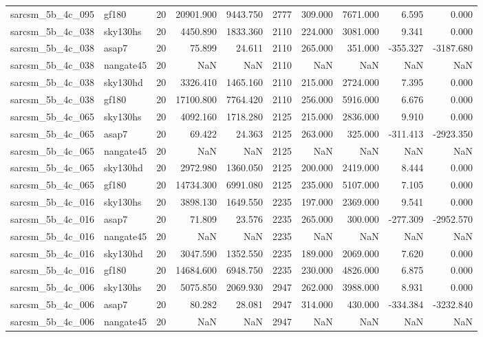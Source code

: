 \documentclass{article}
\begin{document}
\begin{longtable}{llrrrrrrrr}
sarcsm\_5b\_4c\_095 & gf180 & 20 & 20901.900 & 9443.750 & 2777 & 309.000 & 7671.000 & 6.595 & 0.000 \\
sarcsm\_5b\_4c\_038 & sky130hs & 20 & 4450.890 & 1833.360 & 2110 & 224.000 & 3081.000 & 9.341 & 0.000 \\
sarcsm\_5b\_4c\_038 & asap7 & 20 & 75.899 & 24.611 & 2110 & 265.000 & 351.000 & -355.327 & -3187.680 \\
sarcsm\_5b\_4c\_038 & nangate45 & 20 & NaN & NaN & 2110 & NaN & NaN & NaN & NaN \\
sarcsm\_5b\_4c\_038 & sky130hd & 20 & 3326.410 & 1465.160 & 2110 & 215.000 & 2724.000 & 7.395 & 0.000 \\
sarcsm\_5b\_4c\_038 & gf180 & 20 & 17100.800 & 7764.420 & 2110 & 256.000 & 5916.000 & 6.676 & 0.000 \\
sarcsm\_5b\_4c\_065 & sky130hs & 20 & 4092.160 & 1718.280 & 2125 & 215.000 & 2836.000 & 9.910 & 0.000 \\
sarcsm\_5b\_4c\_065 & asap7 & 20 & 69.422 & 24.363 & 2125 & 263.000 & 325.000 & -311.413 & -2923.350 \\
sarcsm\_5b\_4c\_065 & nangate45 & 20 & NaN & NaN & 2125 & NaN & NaN & NaN & NaN \\
sarcsm\_5b\_4c\_065 & sky130hd & 20 & 2972.980 & 1360.050 & 2125 & 200.000 & 2419.000 & 8.444 & 0.000 \\
sarcsm\_5b\_4c\_065 & gf180 & 20 & 14734.300 & 6991.080 & 2125 & 235.000 & 5107.000 & 7.105 & 0.000 \\
sarcsm\_5b\_4c\_016 & sky130hs & 20 & 3898.130 & 1649.550 & 2235 & 197.000 & 2369.000 & 9.541 & 0.000 \\
sarcsm\_5b\_4c\_016 & asap7 & 20 & 71.809 & 23.576 & 2235 & 265.000 & 300.000 & -277.309 & -2952.570 \\
sarcsm\_5b\_4c\_016 & nangate45 & 20 & NaN & NaN & 2235 & NaN & NaN & NaN & NaN \\
sarcsm\_5b\_4c\_016 & sky130hd & 20 & 3047.590 & 1352.550 & 2235 & 189.000 & 2069.000 & 7.620 & 0.000 \\
sarcsm\_5b\_4c\_016 & gf180 & 20 & 14684.600 & 6948.750 & 2235 & 230.000 & 4826.000 & 6.875 & 0.000 \\
sarcsm\_5b\_4c\_006 & sky130hs & 20 & 5075.850 & 2069.930 & 2947 & 262.000 & 3988.000 & 8.931 & 0.000 \\
sarcsm\_5b\_4c\_006 & asap7 & 20 & 80.282 & 28.081 & 2947 & 314.000 & 430.000 & -334.384 & -3232.840 \\
sarcsm\_5b\_4c\_006 & nangate45 & 20 & NaN & NaN & 2947 & NaN & NaN & NaN & NaN \\

\end{longtable}
\end{document}
